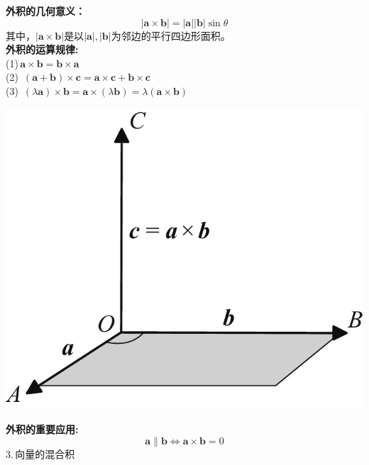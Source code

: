 \noindent
\begin{minipage}{0.5\linewidth}
\textbf{外积的几何意义：}
\begin{equation}
	|\boldsymbol{a}\times\boldsymbol{b}|=|\boldsymbol{a}||\boldsymbol{b}|\sin \theta
\end{equation}
其中，$|\boldsymbol{a}\times\boldsymbol{b}|$是以$|\boldsymbol{a}|,|\boldsymbol{b}|$为邻边的平行四边形面积。\\
\textbf{外积的运算规律:}\\
(1)$\,$\qquad $\boldsymbol{a}\times\boldsymbol{b}=\boldsymbol{b}\times\boldsymbol{a}$\\
(2)$\,$\qquad
$(\boldsymbol{a}+\boldsymbol{b})\times\boldsymbol{c}=\boldsymbol{a}\times\boldsymbol{c}+\boldsymbol{b}\times\boldsymbol{c}$\\
(3)$\,$\qquad
$(\lambda\boldsymbol{a})\times\boldsymbol{b}=\boldsymbol{a}\times(\lambda\boldsymbol{b})=\lambda(\boldsymbol{a}\times\boldsymbol{b})$\\
\end{minipage}
\begin{minipage}{0.5\linewidth}
	\centering
	\includegraphics[width = 0.6\linewidth]{pic/C-5/veccross}
	\vspace*{-1em}
	\label{向量的外积}
\end{minipage}

\noindent \textbf{外积的重要应用:}
\begin{equation}
	\boldsymbol{a}\parallel\boldsymbol{b}\Leftrightarrow \boldsymbol{a}\times\boldsymbol{b}=0
\end{equation}
3.$\,$向量的混合积\\

\vspace*{-1em}\vspace*{-1em}

